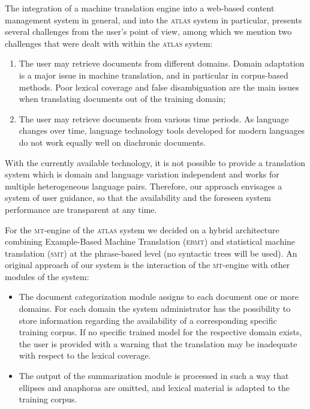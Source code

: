 \documentclass[output=paper]{LSP/langsci}
\begin{document}
The integration of a machine translation engine into a web-based content management system in general, and into the \textsc{atlas} system in particular, presents several challenges from the user's point of view, among which we mention two challenges that were dealt with within the \textsc{atlas} system:

\begin{enumerate}
\item   
The user may retrieve documents from different domains. Domain adaptation is a major issue in machine translation, and in particular in corpus-based methods. Poor lexical coverage and false disambiguation are the main issues when translating documents out of the training domain;
\item
The user may retrieve documents from various time periods. As language changes over time, language technology tools developed for modern languages do not work equally well on diachronic documents. 
\end{enumerate}

With the currently available technology, it is not possible to provide a translation system which is domain and language variation independent and works for multiple heterogeneous language pairs. Therefore, our approach envisages a system of user guidance, so that the availability and the foreseen system performance are transparent at any time.

For the \textsc{mt}-engine of the \textsc{atlas} system we decided on a hybrid architecture combining Example-Based Machine Translation (\textsc{ebmt}) \citep{Gavrila2011} and statistical machine translation (\textsc{smt}) \citep{KoehnEtAl2007} at the phrase-based level (no syntactic trees will be used). An original approach of our system is the interaction of the \textsc{mt}-engine with other modules of the system:

\begin{itemize}
\item 
The document categorization module assigns to each document one or more domains. For each domain the system administrator has the possibility to store information regarding the availability of a corresponding specific training corpus. If no specific trained model for the respective domain exists, the user is provided with a warning that the translation may be inadequate with respect to the lexical coverage.
\item 
The output of the summarization module is processed in such a way that ellipses and anaphoras are omitted, and lexical material is adapted to the training corpus.
\end{itemize}
\end{document}
